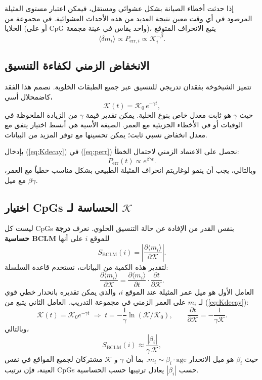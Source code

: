 \documentclass[11pt,a4paper]{article}
\newcommand{\REL}{\mathcal{K}}          %
\begin{document}
	إذا حدثت أخطاء الصيانة بشكل عشوائي ومستقل، فيمكن اعتبار مستوى المثيلة المرصود في أي وقت معين نتيجة العديد من هذه الأحداث العشوائية. في مجموعة من الخلايا (أو على CpG واحد يقاس في عينة مجمعة)، يتبع الانحراف المتوقع
	\[
	\langle \delta m_i \rangle \propto P_{\mathrm{err},i} \propto \REL_i^{-\beta}.
	\]
	
	\subsection{الانخفاض الزمني لكفاءة التنسيق}
	تتميز الشيخوخة بفقدان تدريجي للتنسيق عبر جميع الطبقات الخلوية. نصمم هذا الفقد كاضمحلال أسي،
	\begin{equation}
		\REL(t) = \REL_0 \, e^{-\gamma t},
		\label{eq:Kdecay}
	\end{equation}
	حيث \(\gamma\) هو ثابت معدل خاص بنوع الخلية. يمكن تقدير قيمة \(\gamma\) من الزيادة الملحوظة في الوفيات أو في الأخطاء الجزيئية مع العمر. الصيغة الأسية هي أبسط اختيار يتفق مع معدل انخفاض نسبي ثابت؛ يمكن تحسينها مع توفر المزيد من البيانات.
	
	بإدخال (\ref{eq:Kdecay}) في (\ref{eq:perr}) نحصل على الاعتماد الزمني لاحتمال الخطأ:
	\[
	P_{\mathrm{err}}(t) \propto e^{\beta\gamma t}.
	\]
	وبالتالي، يجب أن ينمو لوغاريتم انحراف المثيلة الطبيعي بشكل مناسب خطياً مع العمر، مع ميل \(\beta\gamma\).
	
	\subsection{اختيار CpGs الحساسة لـ \(\REL\)}
	ليست كل CpGs بنفس القدر من الإفادة عن حالة التنسيق الخلوي. نعرف \textbf{درجة حساسية BCLM} للموقع \(i\) على أنها
	\begin{equation}
		S_{\mathrm{BCLM}}(i) = \left| \frac{\partial \langle m_i \rangle}{\partial \REL} \right|.
		\label{eq:sensitivity}
	\end{equation}
	لتقدير هذه الكمية من البيانات، نستخدم قاعدة السلسلة:
	\[
	\frac{\partial \langle m_i \rangle}{\partial \REL} = \frac{\partial \langle m_i \rangle}{\partial t} \cdot \frac{\partial t}{\partial \REL}.
	\]
	العامل الأول هو ميل عمر المثيلة عند الموقع \(i\)، والذي يمكن تقديره بانحدار خطي قوي لـ \(m_i\) على العمر الزمني في مجموعة التدريب. العامل الثاني يتبع من (\ref{eq:Kdecay}):
	\[
	\REL(t) = \REL_0 e^{-\gamma t} \;\Longrightarrow\; t = -\frac{1}{\gamma}\ln(\REL/\REL_0),\qquad
	\frac{\partial t}{\partial \REL} = -\frac{1}{\gamma \REL}.
	\]
	وبالتالي،
	\[
	S_{\mathrm{BCLM}}(i) \approx \frac{|\beta_i|}{\gamma \, \REL},
	\]
	حيث \(\beta_i\) هو ميل الانحدار \(m_i \sim \beta_i \cdot \text{age}\). بما أن \(\gamma\) و \(\REL\) مشتركان لجميع المواقع في نفس العينة، فإن ترتيب CpGs حسب \(|\beta_i|\) يعادل ترتيبها حسب الحساسية.
	
\end{document}
